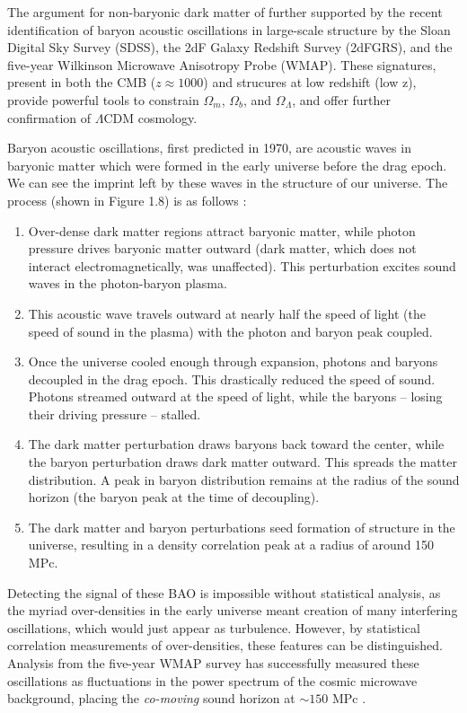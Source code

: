\documentclass{report}
\begin{document}
The argument for non-baryonic dark matter of further supported by the recent identification of baryon acoustic oscillations in large-scale structure by the Sloan Digital Sky Survey (SDSS), the 2dF Galaxy Redshift Survey (2dFGRS), and the five-year Wilkinson Microwave Anisotropy Probe (WMAP). These signatures, present in both the CMB ($z \approx 1000$) and strucures at low redshift (low z), provide powerful tools to constrain $\Omega_{m}$, $\Omega_{b}$, and $\Omega_{\Lambda}$, and offer further confirmation of $\Lambda$CDM cosmology.

Baryon acoustic oscillations, first predicted in 1970, are acoustic waves in baryonic matter which were formed in the early universe before the drag epoch. We can see the imprint left by these waves in the structure of our universe. The process (shown in Figure 1.8) is as follows \cite{Eisenstein2005}:

\begin{enumerate}
\item Over-dense dark matter regions attract baryonic matter, while photon pressure drives baryonic matter outward (dark matter, which does not interact electromagnetically, was unaffected). This perturbation excites sound waves in the photon-baryon plasma.
\item This acoustic wave travels outward at nearly half the speed of light (the speed of sound in the plasma) with the photon and baryon peak coupled.
\item Once the universe cooled enough through expansion, photons and baryons decoupled in the drag epoch. This drastically reduced the speed of sound. Photons streamed outward at the speed of light, while the baryons -- losing their driving pressure -- stalled.
\item The dark matter perturbation draws baryons back toward the center, while the baryon perturbation draws dark matter outward. This spreads the matter distribution. A peak in baryon distribution remains at the radius of the sound horizon (the baryon peak at the time of decoupling).
\item The dark matter and baryon perturbations seed formation of structure in the universe, resulting in a density correlation peak at a radius of around 150 MPc.
\end{enumerate}

Detecting the signal of these BAO is impossible without statistical analysis, as the myriad over-densities in the early universe meant creation of many interfering oscillations, which would just appear as turbulence. However, by statistical correlation measurements of over-densities, these features can be distinguished. Analysis from the five-year WMAP survey has successfully measured these oscillations as fluctuations in the power spectrum of the cosmic microwave background, placing the \emph{co-moving} sound horizon at $\sim 150$ MPc \cite{Komatsu2008}.
\end{document}
